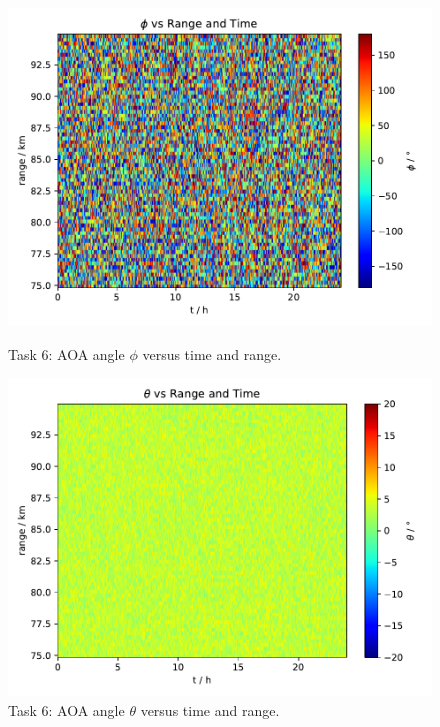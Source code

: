 \begin{figure}
    \centering
    \begin{minipage}{0.48\textwidth}
        \centering
        \includegraphics[width=1.0\textwidth]{graphics/t6/t6_aoa_time_phi.pdf} %
        \caption{Task 6: AOA angle $\phi$ versus time and range.}
        \label{fig:t6-aoa-color-phi}
    \end{minipage}\hfill
    \begin{minipage}{0.48\textwidth}
        \centering
        \includegraphics[width=1\textwidth]{graphics/t6/t6_aoa_time_theta.pdf} %
        \caption{Task 6: AOA angle $\theta$ versus time and range.}
        \label{fig:t6-aoa-color-theta}
    \end{minipage}
\end{figure}


